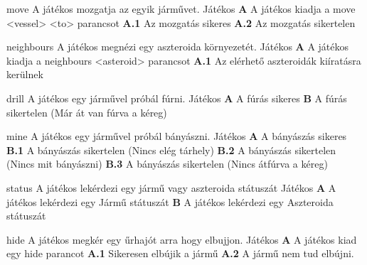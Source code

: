 \documentclass[../../projlab]{subfiles}
\begin{document}
\begin{use-case}
    {move}
    {A játékos mozgatja az egyik járművet.}
    {Játékos} 
    \textbf{A} A játékos kiadja a move <vessel> <to> parancsot \newline
	\textbf{A.1} Az mozgatás sikeres \newline
    \textbf{A.2} Az mozgatás sikertelen

\end{use-case}

\begin{use-case}
    {neighbours}
    {A játékos megnézi egy aszteroida környezetét.}
    {Játékos} 
    \textbf{A} A játékos kiadja a neighbours <asteroid> parancsot \newline
	\textbf{A.1} Az elérhető aszteroidák kiíratásra kerülnek

\end{use-case}

\begin{use-case}
    {drill}
    {A játékos egy járművel próbál fúrni.}
    {Játékos} 
    \textbf{A} A fúrás sikeres \newline
    \textbf{B} A fúrás sikertelen (Már át van fúrva a kéreg) \newline
\end{use-case}

\begin{use-case}
    {mine}
    {A játékos egy járművel próbál bányászni.}
    {Játékos} 
    \textbf{A} A bányászás sikeres \newline
    \textbf{B.1} A bányászás sikertelen (Nincs elég tárhely) \newline
    \textbf{B.2} A bányászás sikertelen (Nincs mit bányászni) \newline
    \textbf{B.3} A bányászás sikertelen (Nincs átfúrva a kéreg) \newline
\end{use-case}

\begin{use-case}
    {status}
    {A játékos lekérdezi egy jármű vagy aszteroida státuszát}
    {Játékos} 
    \textbf{A} A játékos lekérdezi egy Jármű státuszát \newline
    \textbf{B} A játékos lekérdezi egy Aszteroida státuszát
\end{use-case}

\begin{use-case}
    {hide}
    {A játékos megkér egy űrhajót arra hogy elbujjon.}
    {Játékos} 
    \textbf{A} A játékos kiad egy hide parancot \newline
    \textbf{A.1} Sikeresen elbújik a jármű \newline
    \textbf{A.2} A jármű nem tud elbújni.
\end{use-case}
\end{document}
